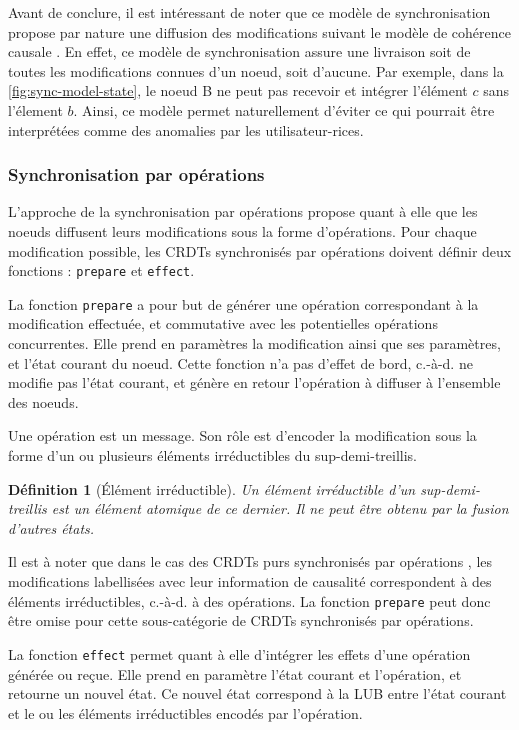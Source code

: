 \documentclass[12pt]{thesul}
\newtheorem{definition}{Définition}
\newcommand{\ie}{c.-à-d. }
\begin{document}
Avant de conclure, il est intéressant de noter que ce modèle de synchronisation propose par nature une diffusion des modifications suivant le modèle de cohérence causale .
En effet, ce modèle de synchronisation assure une livraison soit de toutes les modifications connues d'un noeud, soit d'aucune.
Par exemple, dans la \autoref{fig:sync-model-state}, le noeud B ne peut pas recevoir et intégrer l'élément $c$ sans l'élement $b$.
Ainsi, ce modèle permet naturellement d'éviter ce qui pourrait être interprétées comme des anomalies par les utilisateur-rices.

\subsubsection{Synchronisation par opérations}

L'approche de la synchronisation par opérations propose quant à elle que les noeuds diffusent leurs modifications sous la forme d'opérations.
Pour chaque modification possible, les \acp{CRDT} synchronisés par opérations doivent définir deux fonctions : \texttt{prepare} et \texttt{effect}.

La fonction \texttt{prepare} a pour but de générer une opération correspondant à la modification effectuée, et commutative avec les potentielles opérations concurrentes.
Elle prend en paramètres la modification ainsi que ses paramètres, et l'état courant du noeud.
Cette fonction n'a pas d'effet de bord, \ie ne modifie pas l'état courant, et génère en retour l'opération à diffuser à l'ensemble des noeuds.

Une opération est un message.
Son rôle est d'encoder la modification sous la forme d'un ou plusieurs éléments irréductibles du sup-demi-treillis.

\begin{definition}[Élément irréductible]
  \label{def:irreducible-element}
  Un élément irréductible d'un sup-demi-treillis est un élément atomique de ce dernier.
  Il ne peut être obtenu par la fusion d'autres états.
\end{definition}

Il est à noter que dans le cas des \acp{CRDT} purs synchronisés par opérations \cite{baquero2017pure}, les modifications labellisées avec leur information de causalité correspondent à des éléments irréductibles, \ie à des opérations.
La fonction \texttt{prepare} peut donc être omise pour cette sous-catégorie de \acp{CRDT} synchronisés par opérations.

La fonction \texttt{effect} permet quant à elle d'intégrer les effets d'une opération générée ou reçue.
Elle prend en paramètre l'état courant et l'opération, et retourne un nouvel état.
Ce nouvel état correspond à la \ac{LUB} entre l'état courant et le ou les éléments irréductibles encodés par l'opération.
\end{document}
